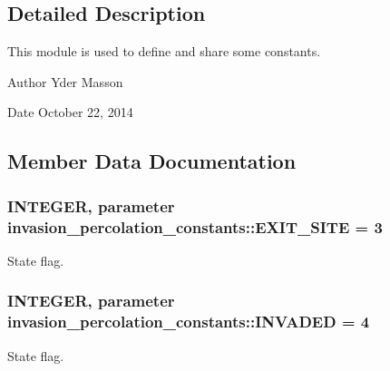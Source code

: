 \subsection{\-Detailed \-Description}
\-This module is used to define and share some constants. 

\begin{DoxyAuthor}{\-Author}
\-Yder \-Masson 
\end{DoxyAuthor}
\begin{DoxyDate}{\-Date}
\-October 22, 2014 
\end{DoxyDate}


\subsection{\-Member \-Data \-Documentation}
\hypertarget{classinvasion__percolation__constants_a537e873dfa2c4a77bd0b7a736d62db2e}{
\subsubsection[{\-E\-X\-I\-T\-\_\-\-S\-I\-T\-E}]{\setlength{\rightskip}{0pt plus 5cm}\-I\-N\-T\-E\-G\-E\-R, parameter {\bf invasion\-\_\-percolation\-\_\-constants\-::\-E\-X\-I\-T\-\_\-\-S\-I\-T\-E} = 3}}
\label{classinvasion__percolation__constants_a537e873dfa2c4a77bd0b7a736d62db2e}


\-State flag. 

\hypertarget{classinvasion__percolation__constants_a018c067c587c644a8ae939cfec98013e}{
\subsubsection[{\-I\-N\-V\-A\-D\-E\-D}]{\setlength{\rightskip}{0pt plus 5cm}\-I\-N\-T\-E\-G\-E\-R, parameter {\bf invasion\-\_\-percolation\-\_\-constants\-::\-I\-N\-V\-A\-D\-E\-D} = 4}}
\label{classinvasion__percolation__constants_a018c067c587c644a8ae939cfec98013e}


\-State flag. 

